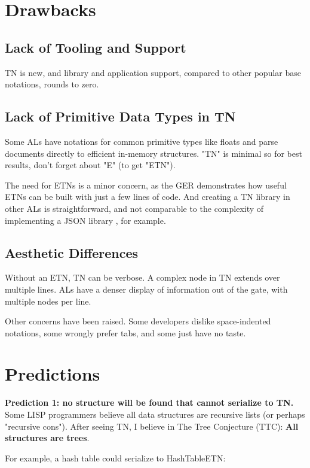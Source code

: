 \documentclass[journal]{IEEEtran}
\begin{document}
\section{Drawbacks}

\subsection{Lack of Tooling and Support}

TN is new, and library and application support, compared to other popular base notations, rounds to zero.

\subsection{Lack of Primitive Data Types in TN}

Some ALs have notations for common primitive types like floats and parse documents directly to efficient in-memory structures. "TN" is minimal so for best results, don't forget about "E" (to get "ETN").

The need for ETNs is a minor concern, as the GER demonstrates how useful ETNs can be built with just a few lines of code. And creating a TN library in other ALs is straightforward, and not comparable to the complexity of implementing a JSON library \cite{Ooms}, for example.

\subsection{Aesthetic Differences}

Without an ETN, TN can be verbose. A complex node in TN extends over multiple lines. ALs have a denser display of information out of the gate, with multiple nodes per line.

Other concerns have been raised. Some developers dislike space-indented notations, some wrongly prefer tabs, and some just have no taste.

\section{Predictions}

\textbf{Prediction 1: no structure will be found that cannot serialize to TN.} Some LISP programmers believe all data structures are recursive lists (or perhaps "recursive cons"). After seeing TN, I believe in The Tree Conjecture (TTC): \textbf{All structures are trees}.

For example, a hash table could serialize to HashTableETN:
\end{document}
